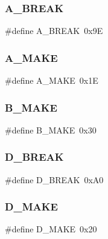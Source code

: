 \subsubsection{\texorpdfstring{A\+\_\+\+B\+R\+E\+AK}{A\_BREAK}}
{\footnotesize\ttfamily \#define A\+\_\+\+B\+R\+E\+AK~0x9E}

\hypertarget{group__scancodes_ga0f76fe84c649e8cf3a4114d0d9bf085a}{}\label{group__scancodes_ga0f76fe84c649e8cf3a4114d0d9bf085a} 
\subsubsection{\texorpdfstring{A\+\_\+\+M\+A\+KE}{A\_MAKE}}
{\footnotesize\ttfamily \#define A\+\_\+\+M\+A\+KE~0x1E}

\hypertarget{group__scancodes_gaa7a13a11c6b4a4b22cc8c2dd5cca7a95}{}\label{group__scancodes_gaa7a13a11c6b4a4b22cc8c2dd5cca7a95} 
\subsubsection{\texorpdfstring{B\+\_\+\+M\+A\+KE}{B\_MAKE}}
{\footnotesize\ttfamily \#define B\+\_\+\+M\+A\+KE~0x30}

\hypertarget{group__scancodes_gad2db9242348c43c781cc14746060470b}{}\label{group__scancodes_gad2db9242348c43c781cc14746060470b} 
\subsubsection{\texorpdfstring{D\+\_\+\+B\+R\+E\+AK}{D\_BREAK}}
{\footnotesize\ttfamily \#define D\+\_\+\+B\+R\+E\+AK~0x\+A0}

\hypertarget{group__scancodes_ga629b0c93e278a4bf1e1678af58fbea95}{}\label{group__scancodes_ga629b0c93e278a4bf1e1678af58fbea95} 
\subsubsection{\texorpdfstring{D\+\_\+\+M\+A\+KE}{D\_MAKE}}
{\footnotesize\ttfamily \#define D\+\_\+\+M\+A\+KE~0x20}

